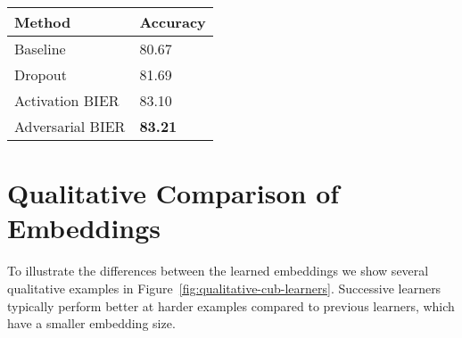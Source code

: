 \documentclass[10pt,journal,compsoc]{IEEEtran}
\begin{document}
\begin{table}[htbp]
    \label{tbl:cifar-10-quick-wide-results}
    \centering
    \renewcommand{\arraystretch}{1.3}
    \begin{tabular}{ll}
        \hline
        Method   & Accuracy \\
        \hline
        Baseline & 80.67  \\
        Dropout  & 81.69 \\
        \hline
        Activation BIER     & 83.10    \\
        Adversarial BIER    & \textbf{83.21}    \\
        \hline
    \end{tabular}
\end{table}\section{Qualitative Comparison of Embeddings}\label{sec:qualitative-comparison-of-embeddings}

To illustrate the differences between the learned embeddings we show several qualitative examples in Figure~\ref{fig:qualitative-cub-learners}. 
Successive learners typically perform better at harder examples compared to previous learners, which have a smaller embedding size.
\end{document}
